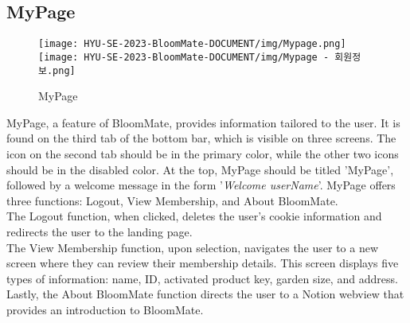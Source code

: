 \documentclass[conference, a4paper]{IEEEtran}
\begin{document}
\subsection{MyPage}
    \begin{figure}[h]
    \centerline{
        \texttt{[image: HYU-SE-2023-BloomMate-DOCUMENT/img/Mypage.png]}
        \texttt{[image: HYU-SE-2023-BloomMate-DOCUMENT/img/Mypage - 회원정보.png]}
    }
    \label{fig}
    \caption{MyPage}
    \end{figure}
 MyPage, a feature of BloomMate, provides information tailored to the user. It is found on the third tab of the bottom bar, which is visible on three screens. The icon on the second tab should be in the primary color, while the other two icons should be in the disabled color. At the top, MyPage should be titled 'MyPage', followed by a welcome message in the form '\textit{Welcome userName}'. MyPage offers three functions: Logout, View Membership, and About BloomMate.\\

The Logout function, when clicked, deletes the user's cookie information and redirects the user to the landing page.\\

The View Membership function, upon selection, navigates the user to a new screen where they can review their membership details. This screen displays five types of information: name, ID, activated product key, garden size, and address.\\

Lastly, the About BloomMate function directs the user to a Notion webview that provides an introduction to BloomMate.\\
\end{document}
